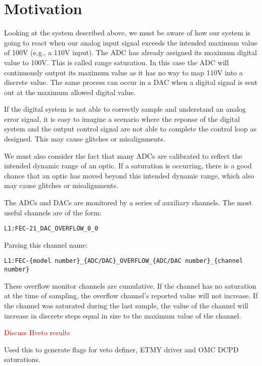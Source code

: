 \section{Motivation}

Looking at the system described above, we must be aware of how our system is going to react when our analog input signal exceeds the intended maximum value of 100V (e.g., a 110V input). The ADC has already assigned its maximum digital value to 100V. This is called range saturation. In this case the ADC will continuously output its maximum value as it has no way to map 110V into a discrete value. The same process can occur in a DAC when a digital signal is sent out at the maximum allowed digital value.

If the digital system is not able to correctly sample and understand an analog error signal, it is easy to imagine a scenario where the reponse of the digital system and the output control signal are not able to complete the control loop as designed. This may cause glitches or misalignments.

We must also consider the fact that many ADCs are calibrated to reflect the intended dynamic range of an optic.  If a saturation is occurring, there is a good chance that an optic has moved beyond this intended dynamic range, which also may cause glitches or misalignments.

The ADCs and DACs are monitored by a series of auxiliary channels.  The most useful channels are of the form:

\begin{verbatim}
L1:FEC-21_DAC_OVERFLOW_0_0
\end{verbatim}

Parsing this channel name:

\begin{verbatim}
L1:FEC-{model number}_{ADC/DAC}_OVERFLOW_{ADC/DAC number}_{channel number}
\end{verbatim}

These overflow monitor channels are cumulative. If the channel has no saturation at the time of sampling, the overflow channel's reported value will not increase. If the channel was saturated during the last sample, the value of the channel will increase in discrete steps equal in size to the maximum value of the channel.


\textcolor{red}{Discuss Hveto results}

Used this to generate flags for veto definer, ETMY driver and OMC DCPD saturations.

